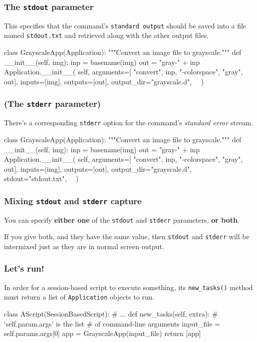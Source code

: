 \documentclass[english,serif,mathserif,xcolor=pdftex,dvipsnames,table]{beamer}
\begin{document}
\begin{frame}[fragile]
\frametitle{The \texttt{stdout} parameter}

This specifies that the command's \texttt{standard output} should be
saved into a file named \texttt{stdout.txt} and retrieved along with
the other output files.

  \+
\begin{python}
class GrayscaleApp(Application):
  """Convert an image file to grayscale."""
  def __init__(self, img):
    inp = basename(img)
    out = "gray-" + inp
    Application.__init__(
      self,
      arguments=[
        "convert", inp, "-colorspace", "gray", out],
      inputs=[img],
      outputs=[out],
      output_dir="grayscale.d",
      ~~)
\end{python}
\end{frame}


\begin{frame}[fragile]
\frametitle{(The \texttt{stderr} parameter)}

There's a corresponding \texttt{stderr} option for the command's
\emph{standard error} stream.

\begin{python}
class GrayscaleApp(Application):
  """Convert an image file to grayscale."""
  def __init__(self, img):
    inp = basename(img)
    out = "gray-" + inp
    Application.__init__(
      self,
      arguments=[
        "convert", inp, "-colorspace", "gray", out],
      inputs=[img],
      outputs=[out],
      output_dir="grayscale.d",
      stdout="stdout.txt",
      ~~)
\end{python}
\end{frame}


\begin{frame}
  \frametitle{Mixing \texttt{stdout} and \texttt{stderr} capture}

  You can specify \textbf{either one} of the \texttt{stdout} and
  \texttt{stderr} parameters, \textbf{or both}.

  \+
  If you give both, and they have the same value, then
  \texttt{stdout} and \texttt{stderr} will be intermixed just as they
  are in normal screen output.
\end{frame}


\begin{frame}[fragile]
  \frametitle{Let's run!}
  In order for a session-based script to execute something, its
  \texttt{new\_tasks()} method must return a list of
  \texttt{Application} objects to run.

\+
\begin{python}
class AScript(SessionBasedScript):
  # ...
  def new_tasks(self, extra):
    # `self.param.args' is the list
    # of command-line arguments
    input_file = self.params.args[0]
    app = GrayscaleApp(input_file)
    return [app]
\end{python}
\end{frame}
\end{document}
